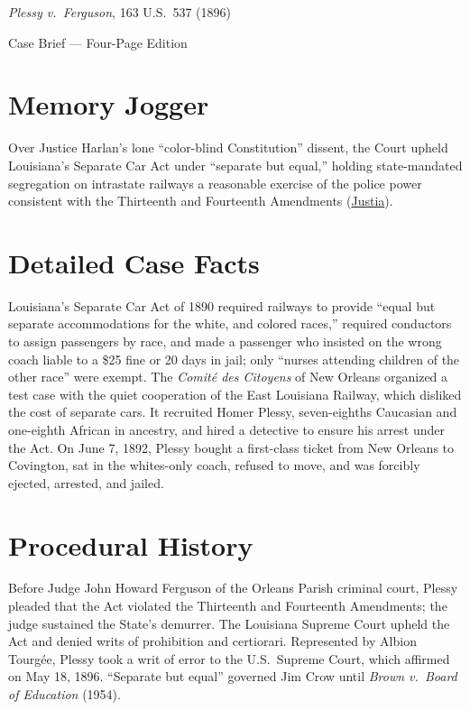 \documentclass[12pt]{article}
\begin{document}
\begin{center}
{\LARGE \textit{Plessy v.\ Ferguson}, 163 U.S.\ 537 (1896)\par}
\vspace{0.8em}
{\large Case Brief --- Four-Page Edition\par}
\end{center}
\vspace{1em}

\section{Memory Jogger}

Over Justice Harlan's lone ``color-blind Constitution'' dissent, the Court upheld Louisiana's Separate Car Act under ``separate but equal,'' holding state-mandated segregation on intrastate railways a reasonable exercise of the police power consistent with the Thirteenth and Fourteenth Amendments (\href{https://supreme.justia.com/cases/federal/us/163/537/}{Justia}).

\section{Detailed Case Facts}

Louisiana's Separate Car Act of 1890 required railways to provide ``equal but separate accommodations for the white, and colored races,'' required conductors to assign passengers by race, and made a passenger who insisted on the wrong coach liable to a \$25 fine or 20 days in jail; only ``nurses attending children of the other race'' were exempt. The \textit{Comit\'e des Citoyens} of New Orleans organized a test case with the quiet cooperation of the East Louisiana Railway, which disliked the cost of separate cars. It recruited Homer Plessy, seven-eighths Caucasian and one-eighth African in ancestry, and hired a detective to ensure his arrest under the Act. On June 7, 1892, Plessy bought a first-class ticket from New Orleans to Covington, sat in the whites-only coach, refused to move, and was forcibly ejected, arrested, and jailed.

\section{Procedural History}

Before Judge John Howard Ferguson of the Orleans Parish criminal court, Plessy pleaded that the Act violated the Thirteenth and Fourteenth Amendments; the judge sustained the State's demurrer. The Louisiana Supreme Court upheld the Act and denied writs of prohibition and certiorari. Represented by Albion Tourg\'ee, Plessy took a writ of error to the U.S.\ Supreme Court, which affirmed on May 18, 1896. ``Separate but equal'' governed Jim Crow until \textit{Brown v.\ Board of Education} (1954).
\end{document}
